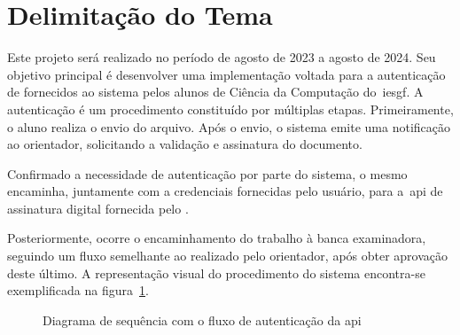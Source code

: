 \section{Delimitação do Tema}\label{sec:delimitacao-do-tema}

Este projeto será realizado no período de agosto de 2023 a agosto de 2024.
Seu objetivo principal é desenvolver uma implementação voltada para a
autenticação de  fornecidos ao sistema pelos alunos de Ciência da
Computação do~\acrfull{iesgf}.
A autenticação é um procedimento constituído por múltiplas etapas.
Primeiramente, o aluno realiza o envio do arquivo.
Após o envio, o sistema emite uma notificação ao orientador, solicitando a
validação e assinatura do documento.

Confirmado a necessidade de autenticação por parte do sistema, o mesmo
encaminha, juntamente com a credenciais fornecidas pelo usuário, para a~\acrshort{api} de
assinatura digital fornecida pelo \citeauthor*{govbr2020}.

Posteriormente, ocorre o encaminhamento do trabalho à banca examinadora,
seguindo um fluxo semelhante ao realizado pelo orientador, após obter aprovação
deste último.
A representação visual do procedimento do sistema encontra-se exemplificada
na figura~\ref{fig:diagrama-sequencia-api}.

\begin{figure}[h!]
    \caption[Diagrama de sequência Autenticação \acrshort{api}]{
        Diagrama de sequência com o fluxo de autenticação
        da \acrshort{api}}
    \sourcesearchfootnote
    \label{fig:diagrama-sequencia-api}
\end{figure}

